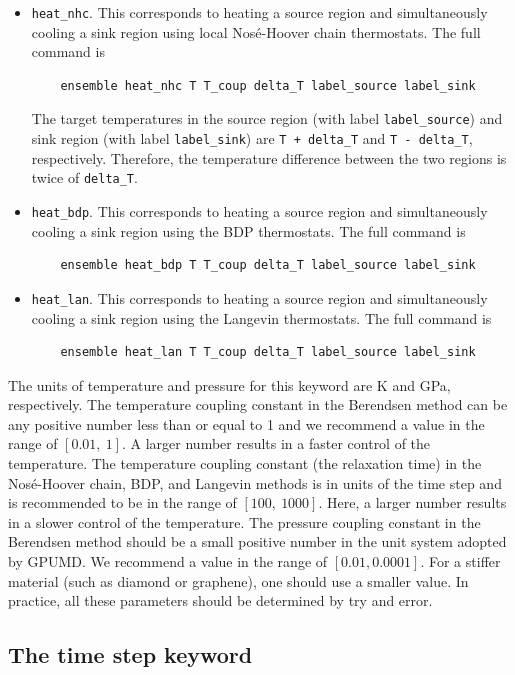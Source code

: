 \documentclass[12pt,a4paper]{report}
\begin{document}
\begin{itemize}
\item \verb"heat_nhc". This corresponds to heating a source region and simultaneously cooling a sink region using local Nos\'{e}-Hoover chain thermostats. The full command is
\begin{verbatim}
    ensemble heat_nhc T T_coup delta_T label_source label_sink
\end{verbatim}
The target temperatures in the source region (with label \verb"label_source") and sink region (with label \verb"label_sink") are \verb"T + delta_T" and \verb"T - delta_T", respectively. Therefore, the temperature difference between the two regions is twice of \verb"delta_T".

\item \verb"heat_bdp". This corresponds to heating a source region and simultaneously cooling a sink region using the BDP thermostats. The full command is
\begin{verbatim}
    ensemble heat_bdp T T_coup delta_T label_source label_sink
\end{verbatim}


\item \verb"heat_lan". This corresponds to heating a source region and simultaneously cooling a sink region using the Langevin thermostats. The full command is
\begin{verbatim}
    ensemble heat_lan T T_coup delta_T label_source label_sink
\end{verbatim}

\end{itemize}


The units of temperature and pressure for this keyword are K and GPa, respectively. The temperature coupling constant in the Berendsen method can be any positive number less than or equal to 1 and we recommend a value in the range of $[0.01,~1]$. A larger number results in a faster control of the temperature. The temperature coupling constant (the relaxation time) in the Nos\'{e}-Hoover chain, BDP, and Langevin methods is in units of the time step and is recommended to be in the range of $[100,~1000]$. Here, a larger number results in a slower control of the temperature. The pressure coupling constant in the Berendsen method should be a small positive number in the unit system adopted by GPUMD. We recommend a value in the range of $[0.01,0.0001]$. For a stiffer material (such as diamond or graphene), one should use a smaller value. In practice, all these parameters should be determined by try and error.


\subsection{The time step keyword}
\end{document}
